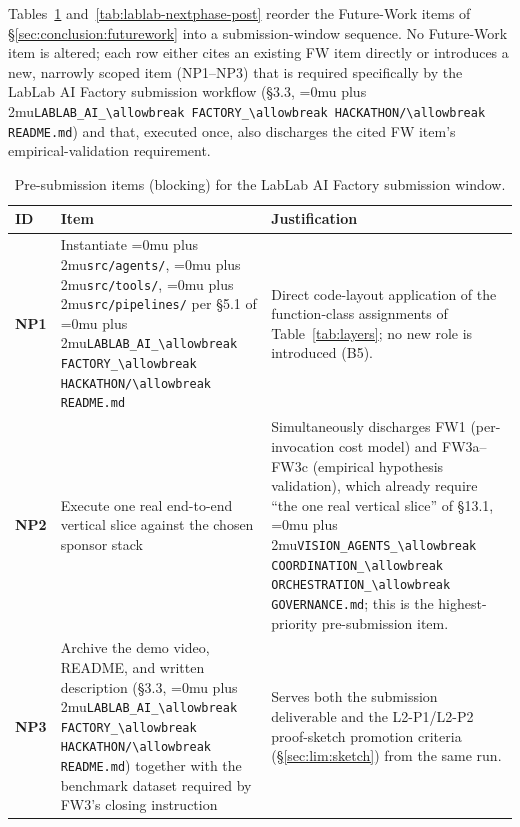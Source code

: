 \documentclass[12pt]{article}
\theoremstyle{definition}
\DeclareRobustCommand{\code}[1]{\begingroup\Urlmuskip=0mu plus 2mu\relax\nolinkurl{#1}\endgroup}
\newcommand{\VisionGov}{\code{VISION\_AGENTS\_\allowbreak COORDINATION\_\allowbreak ORCHESTRATION\_\allowbreak GOVERNANCE.md}}
\newcommand{\LabLabFactoryReadme}{\code{LABLAB\_AI\_\allowbreak FACTORY\_\allowbreak HACKATHON/\allowbreak README.md}}
\begin{document}
Tables~\ref{tab:lablab-nextphase-pre} and~\ref{tab:lablab-nextphase-post}
reorder the Future-Work items of \S\ref{sec:conclusion:futurework} into
a submission-window sequence.  No Future-Work item is altered; each
row either cites an existing FW item directly or introduces a new,
narrowly scoped item (NP1--NP3) that is required specifically by the
LabLab AI Factory submission workflow (\S3.3, \LabLabFactoryReadme{})
and that, executed once, also discharges the cited FW item's
empirical-validation requirement.

\begin{table}[H]
\centering
\caption{Pre-submission items (blocking) for the LabLab AI Factory
         submission window.}
\label{tab:lablab-nextphase-pre}
\begin{tabularx}{\linewidth}{@{}>{\bfseries}p{1.1cm} >{\RaggedRight}p{3.4cm} >{\RaggedRight\arraybackslash}X@{}}
\toprule
\textbf{ID} & \textbf{Item} & \textbf{Justification} \\
\midrule
NP1 &
  Instantiate \code{src/agents/}, \code{src/tools/}, \code{src/pipelines/}
  per \S5.1 of \LabLabFactoryReadme{} &
  Direct code-layout application of the function-class assignments of
  Table~\ref{tab:layers}; no new role is introduced (B5). \\[4pt]
NP2 &
  Execute one real end-to-end vertical slice against the chosen
  sponsor stack &
  Simultaneously discharges FW1 (per-invocation cost model) and
  FW3a--FW3c (empirical hypothesis validation), which already require
  ``the one real vertical slice'' of \S13.1, \VisionGov{}; this is the
  highest-priority pre-submission item. \\[4pt]
NP3 &
  Archive the demo video, README, and written description (\S3.3,
  \LabLabFactoryReadme{}) together with the benchmark dataset required
  by FW3's closing instruction &
  Serves both the submission deliverable and the L2-P1/L2-P2 proof-sketch
  promotion criteria (\S\ref{sec:lim:sketch}) from the same run. \\
\bottomrule
\end{tabularx}
\end{table}
\end{document}
